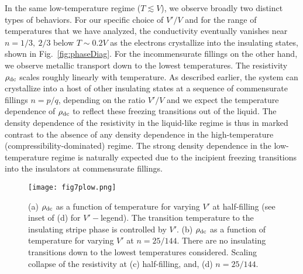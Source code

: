 \documentclass[aps,prx,onecolumn,amsmath,nofootinbib,amssymb,11pt]{revtex4-1}
\def \tn {\textnormal}
\def \rd {\rho_{\tn{dc}}}
\begin{document}
{In the same low-temperature regime ($T\lesssim V$), we observe broadly two distinct types of behaviors. For our specific choice of $V'/V$ and for the range of temperatures that we have analyzed, the conductivity eventually vanishes near $n=1/3,~2/3$ below $T\sim 0.2V$ as the electrons crystallize into the insulating states, shown in Fig.~\ref{fig:phaseDiag}. For the incommensurate fillings on the other hand, we observe metallic transport down to the lowest temperatures. The resistivity $\rd$ scales roughly linearly with temperature. As described earlier, the system can crystallize into a host of other insulating states at a sequence of commensurate fillings $n=p/q$, depending on the ratio $V'/V$ and we expect the temperature dependence of $\rd$ to reflect these freezing transitions out of the liquid. The density dependence of the resistivity in the liquid-like regime is thus in marked contrast to the absence of any density dependence in the high-temperature (compressibility-dominated) regime. The strong density dependence in the low-temperature regime is naturally expected due to the incipient freezing transitions into the insulators at commensurate fillings.  


\begin{figure}
\centering
\texttt{[image: fig7plow.png]}
\caption{\textsf{(a) $\rd$ as a function of temperature for varying $V'$ at half-filling (see inset of (d) for $V'-$legend). The transition temperature to the insulating stripe phase is controlled by $V'$. (b) $\rd$ as a function of temperature for varying $V'$ at $n=25/144$. There are no insulating transitions down to the lowest temperatures considered. Scaling collapse of the resistivity at (c) half-filling, and, (d) $n=25/144$.}}
\label{fig:ResVscaling} 
\end{figure} 

}
\end{document}
